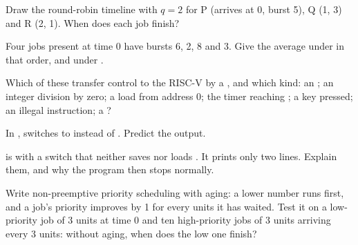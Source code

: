 \begin{exercise}[$\star$]\label{exo:b3:kernel-and-scheduling:1}
Draw the round-robin timeline with $q = 2$ for P (arrives at 0, burst 5), Q (1, 3) and R (2, 1). When does each job finish?
\end{exercise}

\begin{exercise}[$\star$]\label{exo:b3:kernel-and-scheduling:2}
Four jobs present at time 0 have bursts 6, 2, 8 and 3. Give the average  under  in that order, and under .
\end{exercise}

\begin{exercise}[$\star$]\label{exo:b3:kernel-and-scheduling:3}
Which of these transfer control to the RISC-V  by a , and which kind: an ; an integer division by zero; a load from address 0; the timer reaching ; a key pressed; an illegal instruction; a ?
\end{exercise}

\begin{exercise}[$\star$]\label{exo:b3:kernel-and-scheduling:4}
In ,  switches to  instead of . Predict the output.
\end{exercise}

\begin{exercise}[$\star\star$]\label{exo:b3:kernel-and-scheduling:5}
 is  with a switch that neither saves nor loads . It prints only two lines. Explain them, and why the program then stops normally.

\label{out:b3:kernel-and-scheduling:switchbug}
\end{exercise}

\begin{exercise}[$\star\star$]\label{exo:b3:kernel-and-scheduling:6}
Write non-preemptive priority scheduling with aging: a lower number runs first, and a job's priority improves by 1 for every  units it has waited. Test it on a low-priority job of 3 units at time 0 and ten high-priority jobs of 3 units arriving every 3 units: without aging, when does the low one finish?
\end{exercise}

